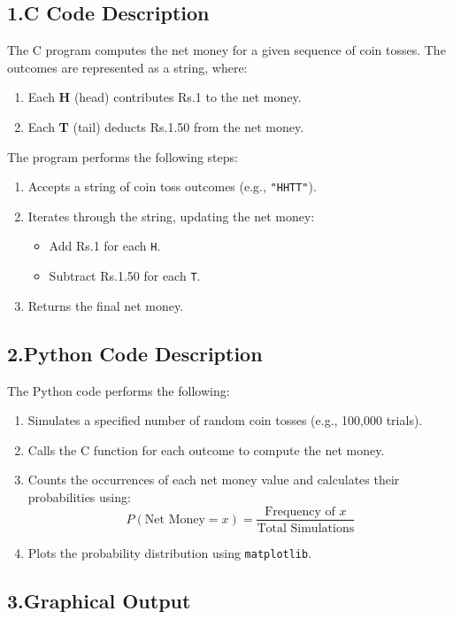 \documentclass[journal]{IEEEtran}
\numberwithin{equation}{enumi}
\numberwithin{figure}{enumi}
\begin{document}
\subsection*{1.C Code Description}

The C program computes the net money for a given sequence of coin tosses. The outcomes are represented as a string, where:
\begin{enumerate}
    \item Each \textbf{H} (head) contributes Rs.1 to the net money.
    \item Each \textbf{T} (tail) deducts Rs.1.50 from the net money.
\end{enumerate}
The program performs the following steps:
\begin{enumerate}
    \item Accepts a string of coin toss outcomes (e.g., \texttt{"HHTT"}).
    \item Iterates through the string, updating the net money:
    \begin{itemize}
        \item Add Rs.1 for each \texttt{H}.
        \item Subtract Rs.1.50 for each \texttt{T}.
    \end{itemize}
    \item Returns the final net money.
\end{enumerate}

\subsection*{2.Python Code Description}

The Python code performs the following:
\begin{enumerate}
    \item Simulates a specified number of random coin tosses (e.g., 100,000 trials).
    \item Calls the C function for each outcome to compute the net money.
    \item Counts the occurrences of each net money value and calculates their probabilities using:
    \[
    P(\text{Net Money} = x) = \frac{\text{Frequency of } x}{\text{Total Simulations}}
    \]
    \item Plots the probability distribution using \texttt{matplotlib}.
\end{enumerate}

\subsection*{3.Graphical Output}
\end{document}

